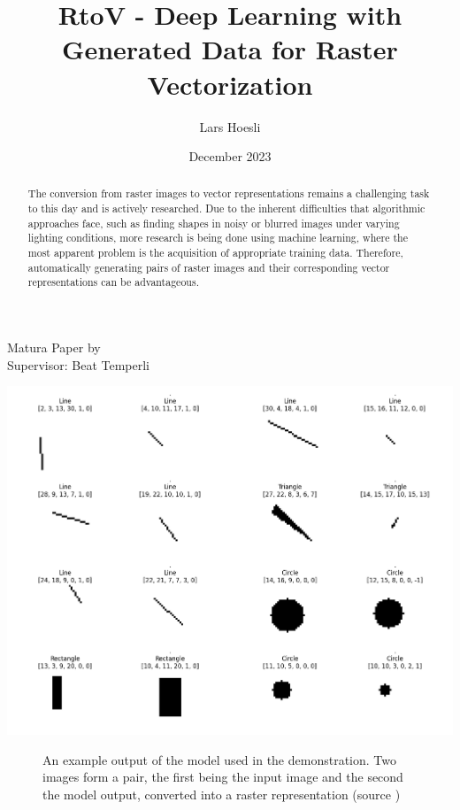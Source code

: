 \documentclass[12pt, a4paper, titlepage]{report}
\title{RtoV - Deep Learning with Generated Data for Raster Vectorization}
\author{Lars Hoesli}
\date{December 2023}
\begin{document}

\begin{titlepage}
    \centering

    \Huge{\textbf{\inserttitle}}
    \par\vspace{0.8cm}
    \LARGE{Matura Paper by \insertauthor}\\
    \vspace{0.2cm}
    \large{Supervisor: Beat Temperli}\\
    \vspace{0.2cm}
    \large{\insertdate}
    \vspace{1.5cm}

    {
       \includegraphics[width=1.0\textwidth]{../rc/images/all_shapes_approx_visual0_condensed.png}
       \label{fig:results_demonstration4_condensed}
    }
    \begin{figure}[ht] %
       \centering
       \caption{An example output of the model used in the demonstration. Two images form a pair, the first being the input image and the second the model output, converted into a raster representation (source \cite{results_demonstration0_condensed})}
    \end{figure}

    \vfill
    \begin{abstract}
       The conversion from raster images to vector representations remains a challenging task to this day and is actively researched. Due to the inherent difficulties that algorithmic approaches face, such as finding shapes in noisy or blurred images under varying lighting conditions, more research is being done using machine learning, where the most apparent problem is the acquisition of appropriate training data. Therefore, automatically generating pairs of raster images and their corresponding vector representations can be advantageous.
       \vspace{0.3cm}


\end{abstract}
\end{titlepage}
\end{document}
